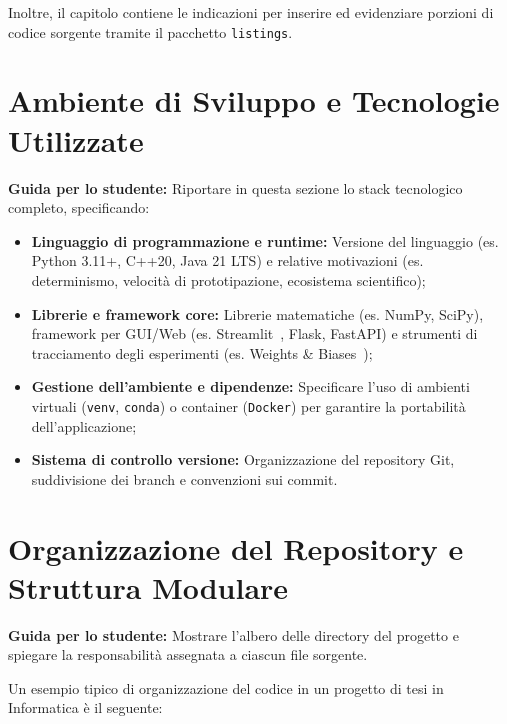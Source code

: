 Inoltre, il capitolo contiene le indicazioni per inserire ed evidenziare porzioni di codice sorgente tramite il pacchetto \texttt{listings}.


\section{Ambiente di Sviluppo e Tecnologie Utilizzate}
\label{sec:ambiente-sviluppo}

\textbf{Guida per lo studente:} Riportare in questa sezione lo stack tecnologico completo, specificando:
\begin{itemize}
    \item \textbf{Linguaggio di programmazione e runtime:} Versione del linguaggio (es. Python 3.11+, C++20, Java 21 LTS) e relative motivazioni (es. determinismo, velocità di prototipazione, ecosistema scientifico);
    \item \textbf{Librerie e framework core:} Librerie matematiche (es. NumPy, SciPy), framework per GUI/Web (es. Streamlit~\cite{streamlit2019}, Flask, FastAPI) e strumenti di tracciamento degli esperimenti (es. Weights \& Biases~\cite{wandb2020});
    \item \textbf{Gestione dell'ambiente e dipendenze:} Specificare l'uso di ambienti virtuali (\texttt{venv}, \texttt{conda}) o container (\texttt{Docker}) per garantire la portabilità dell'applicazione;
    \item \textbf{Sistema di controllo versione:} Organizzazione del repository Git, suddivisione dei branch e convenzioni sui commit.
\end{itemize}


\section{Organizzazione del Repository e Struttura Modulare}
\label{sec:struttura-codice}

\textbf{Guida per lo studente:} Mostrare l'albero delle directory del progetto e spiegare la responsabilità assegnata a ciascun file sorgente.

Un esempio tipico di organizzazione del codice in un progetto di tesi in Informatica è il seguente:

